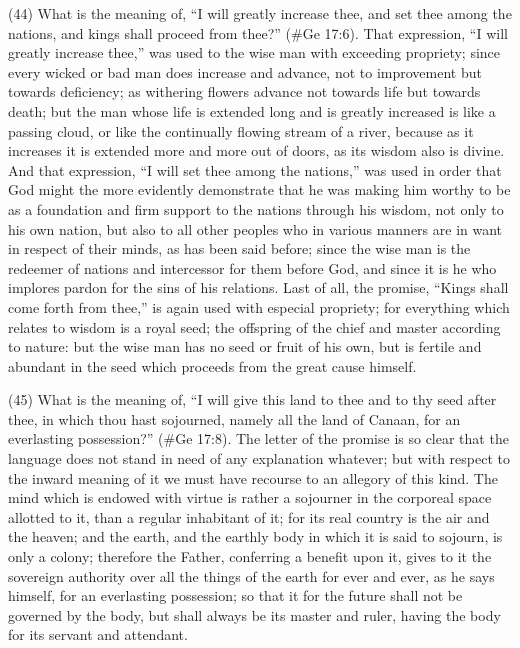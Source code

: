 (44) What is the meaning of, ``I will greatly increase thee, and set thee among the nations, and
kings shall proceed from thee?'' (\#Ge 17:6). That expression, ``I will greatly increase thee,'' was
used to the wise man with exceeding propriety; since every wicked or bad man does increase and
advance, not to improvement but towards deficiency; as withering flowers advance not towards life
but towards death; but the man whose life is extended long and is greatly increased is like a
passing cloud, or like the continually flowing stream of a river, because as it increases it is
extended more and more out of doors, as its wisdom also is divine. And that expression, ``I will set
thee among the nations,'' was used in order that God might the more evidently demonstrate that he
was making him worthy to be as a foundation and firm support to the nations through his wisdom,
not only to his own nation, but also to all other peoples who in various manners are in want in
respect of their minds, as has been said before; since the wise man is the redeemer of nations
and intercessor for them before God, and since it is he who implores pardon for the sins of his
relations. Last of all, the promise, ``Kings shall come forth from thee,'' is again used with especial
propriety; for everything which relates to wisdom is a royal seed; the offspring of the chief and
master according to nature: but the wise man has no seed or fruit of his own, but is fertile and
abundant in the seed which proceeds from the great cause himself.

(45) What is the meaning of, ``I will give this land to thee and to thy seed after thee, in which thou
hast sojourned, namely all the land of Canaan, for an everlasting possession?'' (\#Ge 17:8).
The letter of the promise is so clear that the language does not stand in need of any explanation
whatever; but with respect to the inward meaning of it we must have recourse to an allegory of this
kind. The mind which is endowed with virtue is rather a sojourner in the corporeal space allotted to
it, than a regular inhabitant of it; for its real country is the air and the heaven; and the earth, and the
earthly body in which it is said to sojourn, is only a colony; therefore the Father, conferring a
benefit upon it, gives to it the sovereign authority over all the things of the earth for ever and ever,
as he says himself, for an everlasting possession; so that it for the future shall not be governed by
the body, but shall always be its master and ruler, having the body for its servant and attendant.

